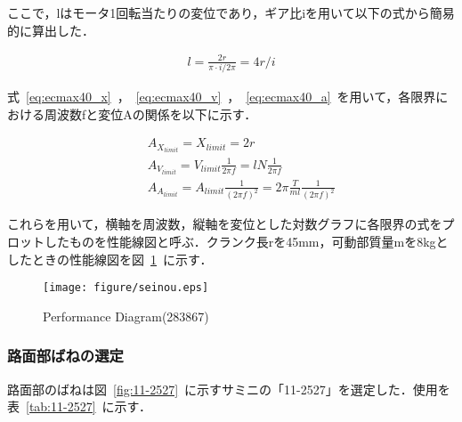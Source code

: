 \documentclass[a4paper,12pt]{article_vdlab_sotsuron}
\begin{document}
\vspace*{10mm}
ここで，lはモータ1回転当たりの変位であり，ギア比iを用いて以下の式から簡易的に算出した．

\begin{eqnarray}
 \label{eq:l} l = \frac{2r}{\pi\cdot i/2\pi} = 4r/i
\end{eqnarray}

\vspace*{10mm}
式~\ref{eq:ecmax40_x}~，~\ref{eq:ecmax40_v}~，~\ref{eq:ecmax40_a}~を用いて，各限界における周波数fと変位Aの関係を以下に示す．

\begin{eqnarray}
 \label{eq:ecmax40_xx} &&A_{X_{limit}} = X_{limit} = 2r \\
 \label{eq:ecmax40_vx} &&A_{V_{limit}} = V_{limit}\frac{1}{2\pi f} =  lN\frac{1}{2\pi f}\\
 \label{eq:ecmax40_ax} &&A_{A_{limit}} = A_{limit}\frac{1}{(2\pi f)^2} = 2\pi\frac{T}{ml}\frac{1}{(2\pi f)^2}
\end{eqnarray}

\vspace*{10mm}
これらを用いて，横軸を周波数，縦軸を変位とした対数グラフに各限界の式をプロットしたものを性能線図と呼ぶ．クランク長rを45mm，可動部質量mを8kgとしたときの性能線図を図~\ref{fig:seinou}~に示す．

\vspace*{10mm}
\begin{figure}[htp]
  \hspace*{45mm}
    \texttt{[image: figure/seinou.eps]}
    \vspace*{3mm}
    \caption{Performance Diagram(283867)}
    \label{fig:seinou}
\end{figure}

\newpage
\subsubsection{路面部ばねの選定}
路面部のばねは図~\ref{fig:11-2527}~に示すサミニの「11-2527」を選定した．使用を表~\ref{tab:11-2527}~に示す．
\end{document}
